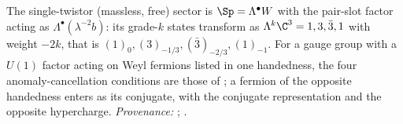 The single-twistor (massless, free) sector is $\Sp = \Lambda^{\bullet}W$ with the pair-slot factor acting as $\Lambda^{\bullet}(\lambda^{-2}b)$: its grade-$k$ states transform as $\Lambda^{k}\C^{3} = 1, 3, \bar{3}, 1$ with weight $-2k$, that is $(1)_{0}, (3)_{-1/3}, (\bar{3})_{-2/3}, (1)_{-1}$. For a gauge group with a $U(1)$ factor acting on Weyl fermions listed in one handedness, the four anomaly-cancellation conditions are those of \cite[Fact~2.7]{ButlerT12}; a fermion of the opposite handedness enters as its conjugate, with the conjugate representation and the opposite hypercharge. \emph{Provenance:} \cite[Prop.~5.3(3), Fact~2.7]{ButlerT12}; \cite[\S 22.4]{WeinbergQFT1}.
